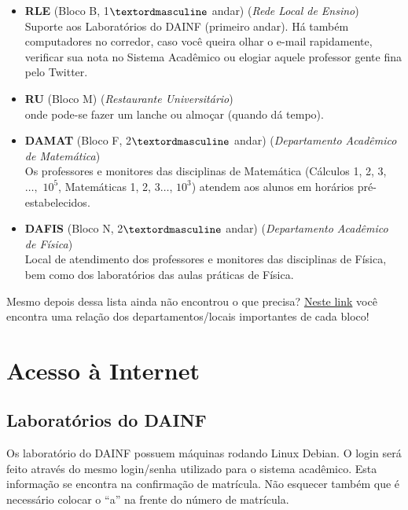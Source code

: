 \documentclass[a4paper,12pt,openany]{article}
\begin{document}
\begin{itemize}
\item \textbf{RLE} (Bloco B, 1$\textordmasculine$ andar) (\textit{Rede Local de Ensino}) \\Suporte aos Laboratórios do DAINF (primeiro andar). Há também computadores no corredor, caso você queira olhar o e-mail rapidamente, verificar sua nota no Sistema Acadêmico ou elogiar aquele professor gente fina pelo Twitter.

\item \textbf{RU} (Bloco M) (\textit{Restaurante Universitário})\\ onde pode-se fazer um lanche ou almoçar (quando dá tempo).

\item \textbf{DAMAT} (Bloco F, 2$\textordmasculine$ andar) (\textit{Departamento Acadêmico de Matemática})\\ Os professores e monitores das disciplinas de Matemática (Cálculos 1, 2, 3, $\ldots,$ $10^5$, Matemáticas 1, 2, 3$\ldots$, $10^3$) atendem aos alunos em horários pré-estabelecidos.

\item \textbf{DAFIS} (Bloco N, 2$\textordmasculine$ andar) (\textit{Departamento Acadêmico de Física})\\  Local de atendimento dos professores e monitores das disciplinas de Física, bem como dos laboratórios das aulas práticas de Física.

\end{itemize}

Mesmo depois dessa lista ainda não encontrou o que precisa? \href{http://200.134.25.110/mapa/mapa.html}{Neste link} você encontra uma relação dos departamentos/locais importantes de cada bloco!


\newpage
\section{Acesso à Internet}

\subsection{Laboratórios do DAINF}

Os laboratório do DAINF possuem máquinas rodando Linux Debian. O login será feito através do mesmo login/senha utilizado para o sistema acadêmico. Esta informação se encontra na confirmação de matrícula. Não esquecer também que é necessário colocar o ``a'' na frente do número de matrícula.
\end{document}
